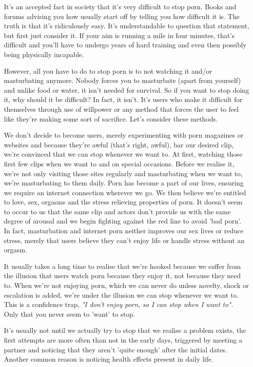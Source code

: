 \documentclass[easypeasy.tex]{subfiles}
\begin{document}
It's an accepted fact in society that it's very difficult to stop porn. Books and forums advising you how usually start off by telling you how difficult it is. The truth is that it's ridiculously easy. It's understandable to question that statement, but first just consider it. If your aim is running a mile in four minutes, that's difficult and you'll have to undergo years of hard training and even then possibly being physically incapable.

However, all you have to do to stop porn is to not watching it and/or masturbating anymore. Nobody forces you to masturbate (apart from yourself) and unlike food or water, it isn't needed for survival. So if you want to stop doing it, why should it be difficult? In fact, it isn't. It's users who make it difficult for themselves through use of willpower or any method that forces the user to feel like they're making some sort of sacrifice. Let's consider these methods.

We don't decide to become users, merely experimenting with porn magazines or websites and because they're awful (that's right, awful), bar our desired clip, we're convinced that we can stop whenever we want to. At first, watching those first few clips when we want to and on special occasions. Before we realise it, we're not only visiting those sites regularly and masturbating when we want to, we're masturbating to them daily. Porn has become a part of our lives, ensuring we require an internet connection wherever we go. We then believe we're entitled to love, sex, orgasms and the stress relieving properties of porn. It doesn't seem to occur to us that the same clip and actors don't provide us with the same degree of arousal and we begin fighting against the red line to avoid 'bad porn'. In fact, masturbation and internet porn neither improves our sex lives or reduce stress, merely that users believe they can't enjoy life or handle stress without an orgasm.

It usually takes a long time to realise that we're hooked because we suffer from the illusion that users watch porn because they enjoy it, not because they need to. When we're not enjoying porn, which we can never do unless novelty, shock or escalation is added, we're under the illusion we can stop whenever we want to. This is a confidence trap, \textit{"I don't enjoy porn, so I can stop when I want to".} Only that you never seem to 'want' to stop.

It's usually not until we actually try to stop that we realise a problem exists, the first attempts are more often than not in the early days, triggered by meeting a partner and noticing that they aren't 'quite enough' after the initial dates. Another common reason is noticing health effects present in daily life.
\end{document}
